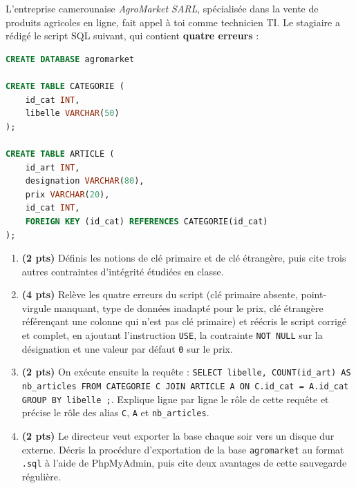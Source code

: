 \documentclass[11pt]{article}
\newcommand{\cle}[1]{{\popxbold\color{popdark}#1}}
\begin{document}
\begin{exercice}
L'entreprise camerounaise \emph{AgroMarket SARL}, spécialisée dans la vente de produits agricoles en ligne, fait appel à toi comme technicien TI. Le stagiaire a rédigé le script SQL suivant, qui contient \textbf{quatre erreurs} :

\begin{lstlisting}[language=SQL]
CREATE DATABASE agromarket

CREATE TABLE CATEGORIE (
    id_cat INT,
    libelle VARCHAR(50)
);

CREATE TABLE ARTICLE (
    id_art INT,
    designation VARCHAR(80),
    prix VARCHAR(20),
    id_cat INT,
    FOREIGN KEY (id_cat) REFERENCES CATEGORIE(id_cat)
);
\end{lstlisting}

\begin{enumerate}
\item \textbf{(2 pts)} Définis les notions de \cle{clé primaire} et de \cle{clé étrangère}, puis cite trois autres contraintes d'intégrité étudiées en classe.
\item \textbf{(4 pts)} Relève les quatre erreurs du script (clé primaire absente, point-virgule manquant, type de données inadapté pour le prix, clé étrangère référençant une colonne qui n'est pas clé primaire) et réécris le script corrigé et complet, en ajoutant l'instruction \texttt{USE}, la contrainte \texttt{NOT NULL} sur la désignation et une valeur par défaut \texttt{0} sur le prix.
\item \textbf{(2 pts)} On exécute ensuite la requête : \texttt{SELECT libelle, COUNT(id\_art) AS nb\_articles FROM CATEGORIE C JOIN ARTICLE A ON C.id\_cat = A.id\_cat GROUP BY libelle ;}. Explique ligne par ligne le rôle de cette requête et précise le rôle des alias \texttt{C}, \texttt{A} et \texttt{nb\_articles}.
\item \textbf{(2 pts)} Le directeur veut exporter la base chaque soir vers un disque dur externe. Décris la procédure d'exportation de la base \texttt{agromarket} au format \texttt{.sql} à l'aide de PhpMyAdmin, puis cite deux avantages de cette sauvegarde régulière.
\end{enumerate}
\end{exercice}
\end{document}
